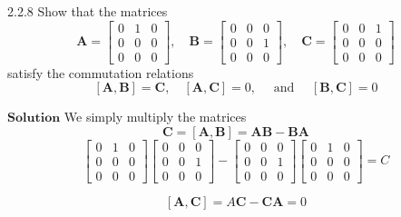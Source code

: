 \documentclass{styles/kaobook}
\begin{document}
\begin{greenbox}{2.2.8}
Show that the matrices
$$\mathbf{A}=\begin{bmatrix}{0} & {1} & {0} \\ {0} & {0} & {0} \\ {0} & {0} & {0}\end{bmatrix}, \quad \mathbf{B}=\begin{bmatrix}{0} & {0} & {0} \\ {0} & {0} & {1} \\ {0} & {0} & {0}\end{bmatrix}, \quad \mathbf{C}=\begin{bmatrix}{0} & {0} & {1} \\ {0} & {0} & {0} \\ {0} & {0} & {0}\end{bmatrix}$$
satisfy the commutation relations
$$
[\mathbf{A}, \mathbf{B}]=\mathbf{C}, \quad[\mathbf{A}, \mathbf{C}]=0, \quad \text { and } \quad[\mathbf{B}, \mathbf{C}]=0
$$
\end{greenbox}


$\boxed{\textbf{Solution}}$ We simply multiply the matrices
$$\mathbf{C}=[\mathbf{A}, \mathbf{B}] = \mathbf{\mathbf{AB}}- \mathbf{BA}$$
$$\begin{bmatrix}{0} & {1} & {0} \\ {0} & {0} & {0} \\ {0} & {0} & {0}\end{bmatrix} \begin{bmatrix}{0} & {0} & {0} \\ {0} & {0} & {1} \\ {0} & {0} & {0}\end{bmatrix} - \begin{bmatrix}{0} & {0} & {0} \\ {0} & {0} & {1} \\ {0} & {0} & {0}\end{bmatrix}\begin{bmatrix}{0} & {1} & {0} \\ {0} & {0} & {0} \\ {0} & {0} & {0}\end{bmatrix} = C$$

$$[\mathbf{A}, \mathbf{C}] = A\mathbf{C}-\mathbf{C}\mathbf{A} = 0$$
\end{document}
